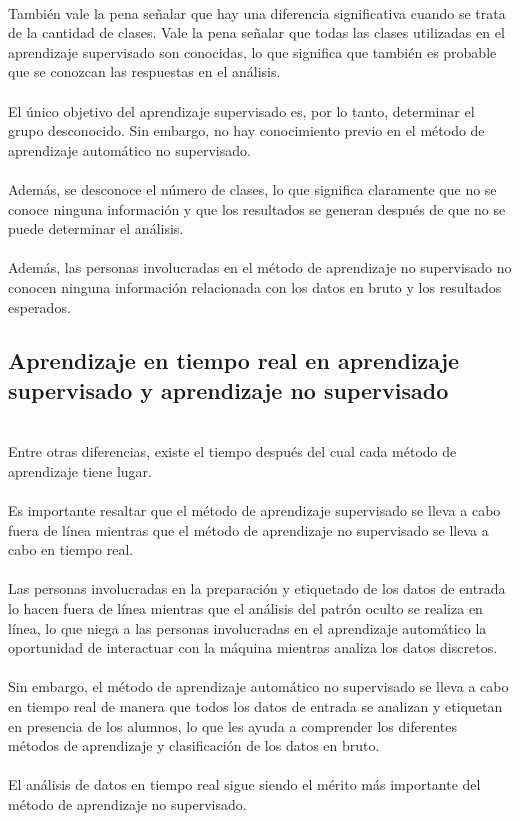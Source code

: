 \documentclass[11pt,a4paper]{article}
\begin{document}
		\\También vale la pena señalar que hay una diferencia significativa cuando se trata de la cantidad de clases. Vale la pena señalar que todas las clases utilizadas en el aprendizaje supervisado son conocidas, lo que significa que también es probable que se conozcan las respuestas en el análisis. \\
		\\El único objetivo del aprendizaje supervisado es, por lo tanto, determinar el grupo desconocido. Sin embargo, no hay conocimiento previo en el método de aprendizaje automático no supervisado. \\
		\\Además, se desconoce el número de clases, lo que significa claramente que no se conoce ninguna información y que los resultados se generan después de que no se puede determinar el análisis.\\
		\\Además, las personas involucradas en el método de aprendizaje no supervisado no conocen ninguna información relacionada con los datos en bruto y los resultados esperados.\\
		
		\subsection{Aprendizaje en tiempo real en aprendizaje supervisado y aprendizaje no supervisado}
		
		\\Entre otras diferencias, existe el tiempo después del cual cada método de aprendizaje tiene lugar. \\
		\\Es importante resaltar que el método de aprendizaje supervisado se lleva a cabo fuera de línea mientras que el método de aprendizaje no supervisado se lleva a cabo en tiempo real. \\
		\\Las personas involucradas en la preparación y etiquetado de los datos de entrada lo hacen fuera de línea mientras que el análisis del patrón oculto se realiza en línea, lo que niega a las personas involucradas en el aprendizaje automático la oportunidad de interactuar con la máquina mientras analiza los datos discretos.\\ 
		\\Sin embargo, el método de aprendizaje automático no supervisado se lleva a cabo en tiempo real de manera que todos los datos de entrada se analizan y etiquetan en presencia de los alumnos, lo que les ayuda a comprender los diferentes métodos de aprendizaje y clasificación de los datos en bruto.\\
		\\El análisis de datos en tiempo real sigue siendo el mérito más importante del método de aprendizaje no supervisado.\\
		
\end{document}
